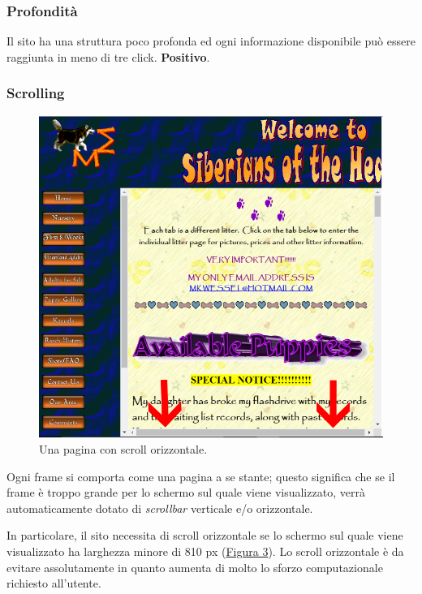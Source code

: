 \documentclass[../rapporto-usabilita.tex]{subfiles}
\begin{document}
		\subsubsection{Profondità}
		Il sito ha una struttura poco profonda ed ogni informazione disponibile può essere raggiunta in meno di tre click.  \textbf{Positivo}.
			
		\subsubsection{Scrolling}			
		
			\begin{figure}[!h]
			\centering
				\includegraphics[scale=0.33]{immagini/horizontal_scroll.jpg}
				\caption{Una pagina con scroll orizzontale.}
				\label{fig:horizontalscroll}
			\end{figure}					
		
		Ogni frame si comporta come una pagina a se stante; questo significa che se il frame è troppo grande per lo schermo sul quale viene visualizzato, verrà automaticamente dotato di \textit{scrollbar} verticale e/o orizzontale.
		
			In particolare, il sito necessita di scroll orizzontale se lo schermo sul quale viene visualizzato ha larghezza minore di 810 px (\hyperref[fig:horizontalscroll]{Figura 3}). Lo scroll orizzontale è da evitare assolutamente in quanto aumenta di molto lo sforzo computazionale richiesto all'utente. 
		
\end{document}
